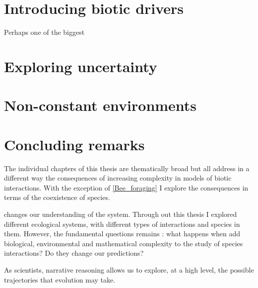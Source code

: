 \begin{refsection}

\section*{Introducing biotic drivers}

Perhaps one of the biggest


\section*{ Exploring uncertainty}


\section*{Non-constant environments}



\section*{Concluding remarks}
The individual chapters of this thesis are thematically broad but all address in a different way the consequences of increasing complexity in models of biotic interactions. With the exception of \autoref{Bee_foraging} I explore the consequences in terms of the coexistence of species.

 changes our understanding of the system. Through out this thesis I explored different ecological systems, with different types of interactions and species in them. However, the fundamental questions remains : what happens when add biological, environmental and mathematical complexity to the study of species interactions? Do they change our predictions?

 As scientists, narrative reasoning allows us to explore, at a high level, the possible trajectories that evolution may take.


\end{refsection}
